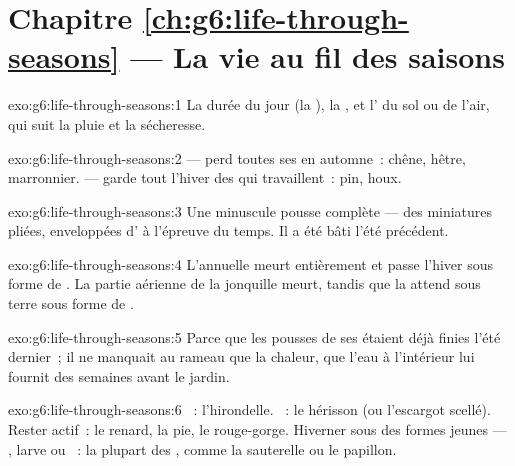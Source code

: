 \section*{Chapitre \ref{ch:g6:life-through-seasons} --- La vie au fil des saisons}

\begin{solution}{exo:g6:life-through-seasons:1}
La durée du jour (la ), la , et l' du sol
ou de l'air, qui suit la pluie et la sécheresse.
\end{solution}

\begin{solution}{exo:g6:life-through-seasons:2}
 --- perd toutes ses  en automne~: chêne, hêtre,
marronnier.  --- garde tout l'hiver des  qui
travaillent~: pin, houx.
\end{solution}

\begin{solution}{exo:g6:life-through-seasons:3}
Une minuscule pousse complète --- des  miniatures pliées,
enveloppées d' à l'épreuve du temps. Il a été bâti l'été
précédent.
\end{solution}

\begin{solution}{exo:g6:life-through-seasons:4}
L'annuelle meurt entièrement et passe l'hiver sous forme de .
La partie aérienne de la jonquille meurt, tandis que la 
attend sous terre sous forme de .
\end{solution}

\begin{solution}{exo:g6:life-through-seasons:5}
Parce que les pousses de ses  étaient déjà finies l'été
dernier~; il ne manquait au rameau que la chaleur, que l'eau à
l'intérieur lui fournit des semaines avant le jardin.
\end{solution}

\begin{solution}{exo:g6:life-through-seasons:6}
~: l'hirondelle. ~: le hérisson (ou l'escargot
scellé). Rester actif~: le renard, la pie, le rouge-gorge. Hiverner
sous des formes jeunes --- , larve ou ~: la plupart des
, comme la sauterelle ou le papillon.
\end{solution}

